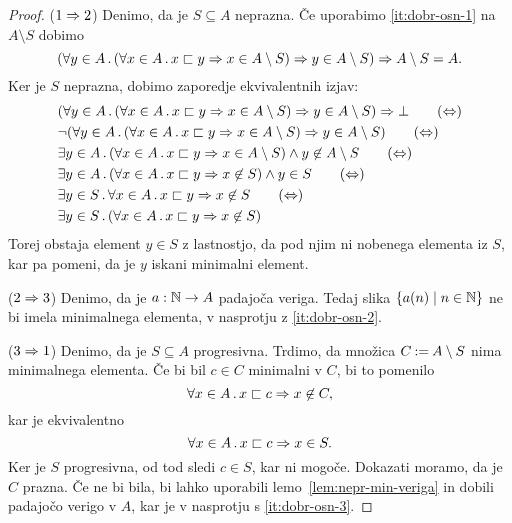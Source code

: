 \begin{proof}
  ($1 \Rightarrow 2$)
  Denimo, da je $S \subseteq A$ neprazna. Če uporabimo \eqref{it:dobr-osn-1} na $A \setminus S$ dobimo
  \begin{equation*}
    (\forall y \in A \,.\, (\forall x \in A \,.\, x \sqsubset y \Rightarrow x \in A \setminus S) \Rightarrow y \in A \setminus S) \Rightarrow A \setminus S = A.
  \end{equation*}
  Ker je $S$ neprazna, dobimo zaporedje ekvivalentnih izjav:
  \begin{align*}
    &(\all{y \in A} (\all{x \in A} x \sqsubset y \lthen x \in A \setminus S) \lthen y \in A \setminus S) \lthen \bot
    \tag{$\liff$} \\
    &\lnot (\all{y \in A} (\all{x \in A} x \sqsubset y \lthen x \in A \setminus S) \lthen y \in A \setminus S)
    \tag{$\liff$} \\
    &\some{y \in A} (\all{x \in A} x \sqsubset y \lthen x \in A \setminus S) \land y \not\in A \setminus S
    \tag{$\liff$} \\
    &\some{y \in A} (\all{x \in A} x \sqsubset y \lthen x \not\in S) \land y \in S
    \tag{$\liff$} \\
    &\some{y \in S} \all{x \in A} x \sqsubset y \lthen x \not\in S
    \tag{$\liff$} \\
    &\some{y \in S} (\all{x \in A} x \sqsubset y \lthen x \not\in S) \notag
  \end{align*}
  Torej obstaja element $y \in S$ z lastnostjo, da pod njim ni nobenega elementa iz
  $S$, kar pa pomeni, da je $y$ iskani minimalni element.

  ($2 \Rightarrow 3$) Denimo, da je $a : \mathbb{N} \to A$ padajoča veriga. Tedaj slika $\left\{ a(n) \mid n \in \mathbb{N} \right\}$ ne bi imela
  minimalnega elementa, v nasprotju z \eqref{it:dobr-osn-2}.

  ($3 \Rightarrow 1$) Denimo, da je $S \subseteq A$ progresivna. Trdimo, da množica $C \mathbin{{:}{=}} A \setminus S$ nima
  minimalnega elementa. Če bi bil $c \in C$ minimalni v $C$, bi to pomenilo
  \begin{equation*}
    \forall x \in A \,.\, x \sqsubset c \Rightarrow x \not\in C,
  \end{equation*}
  kar je ekvivalentno
  \begin{equation*}
    \forall x \in A \,.\, x \sqsubset c \Rightarrow x \in S.
  \end{equation*}
  Ker je $S$ progresivna, od tod sledi $c \in S$, kar ni mogoče.
  Dokazati moramo, da je $C$ prazna. Če ne bi bila, bi lahko uporabili lemo~\ref{lem:nepr-min-veriga} in dobili padajočo verigo v $A$, kar je v nasprotju s \eqref{it:dobr-osn-3}.
\end{proof}

